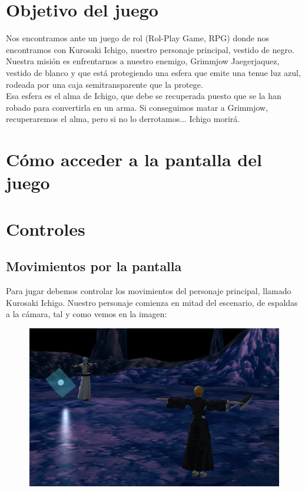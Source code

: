 \documentclass[11pt,a4paper]{article}
\begin{document}
\newpage

\section{Objetivo del juego}

Nos encontramos ante un juego de rol (Rol-Play Game, RPG) donde nos encontramos con Kurosaki Ichigo, nuestro personaje principal, vestido de negro.\\

Nuestra misión es enfrentarnos a nuestro enemigo, Grimmjow Jaegerjaquez, vestido de blanco y que está protegiendo una esfera que emite una tenue luz azul, rodeada por una caja semitransparente que la protege.\\

Esa esfera es el alma de Ichigo, que debe se recuperada puesto que se la han robado para convertirla en un arma. Si conseguimos matar a Grimmjow, recuperaremos el alma, pero si no lo derrotamos... Ichigo morirá.

\section{Cómo acceder a la pantalla del juego}

\section{Controles}

\subsection{Movimientos por la pantalla}

Para jugar debemos controlar los movimientos del personaje principal, llamado Kurosaki Ichigo. Nuestro personaje comienza en mitad del escenario, de espaldas a la cámara, tal y como vemos en la imagen:

\begin{figure}[H]
	\centering
	\includegraphics[scale=0.5]{img/inicio.png}
\end{figure}
\end{document}
